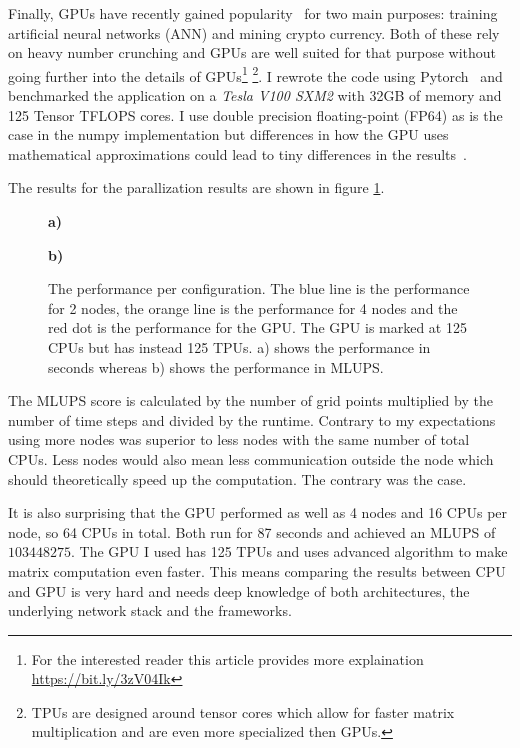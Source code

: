 \documentclass[a4paper,12pt, oneside]{book}
\begin{document}
Finally, GPUs have recently gained popularity~\cite{boyer2013gpu-pop} for two main purposes: training artificial neural networks (ANN) and mining crypto currency. 
Both of these rely on heavy number crunching and GPUs are well suited for that purpose without going further into the details of GPUs\footnote{For the interested reader this article provides more explaination \url{https://bit.ly/3zV04Ik}}
\footnote{TPUs are designed around tensor cores which allow for faster matrix multiplication and are even more specialized then GPUs.}.
I rewrote the code using Pytorch~\cite{pytorch} and benchmarked the application on a \textit{Tesla V100 SXM2} with 32GB of memory and 125 Tensor TFLOPS cores.
I use double precision floating-point (FP64) as is the case in the numpy implementation but differences in how the GPU uses mathematical approximations could lead to tiny differences in the results~\cite{precision-nvidia}.

The results for the parallization results are shown in figure \ref{fig:m7}.
\begin{figure}[ht]
\centering
\textbf{\large a)} \\
\resizebox{0.8\columnwidth}{!}{\large}
\vspace*{2mm}

\textbf{\large b)} \\
\resizebox{0.8\columnwidth}{!}{\large}
\caption[Performance per configuration.]{The performance per configuration. The blue line is the performance for 2 nodes, the orange line is the performance for 4 nodes and the red dot is the performance for the GPU. The GPU is marked at 125 CPUs but has instead 125 TPUs.
a) shows the performance in seconds whereas b) shows the performance in MLUPS.}
\label{fig:m7}
\end{figure}
The MLUPS score is calculated by the number of grid points multiplied by the number of time steps and divided by the runtime.
Contrary to my expectations using more nodes was superior to less nodes with the same number of total CPUs. 
Less nodes would also mean less communication outside the node which should theoretically speed up the computation. The contrary was the case.

It is also surprising that the GPU performed as well as 4 nodes and 16 CPUs per node, so 64 CPUs in total. 
Both run for 87 seconds and achieved an MLUPS of $103448275$.
The GPU I used has 125 TPUs and uses advanced algorithm to make matrix computation even faster. This means comparing the results between CPU and GPU is very hard and needs deep knowledge of both architectures, the underlying network stack and the frameworks.
\end{document}
